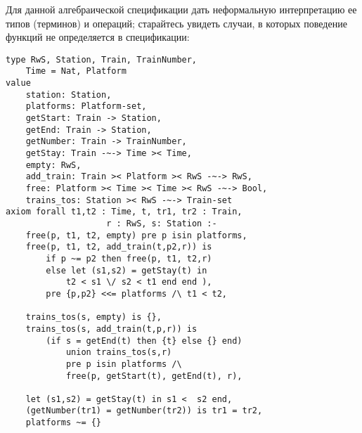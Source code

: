 \z Для данной алгебраической спецификации дать неформальную интерпретацию ее типов (терминов) и операций; старайтесь увидеть случаи, в которых поведение функций не определяется в спецификации:
\begin{lstlisting}
type RwS, Station, Train, TrainNumber,
    Time = Nat, Platform
value
    station: Station,
    platforms: Platform-set,
    getStart: Train -> Station,
    getEnd: Train -> Station,
    getNumber: Train -> TrainNumber,
    getStay: Train -~-> Time >< Time,
    empty: RwS,
    add_train: Train >< Platform >< RwS -~-> RwS,
    free: Platform >< Time >< Time >< RwS -~-> Bool,
    trains_tos: Station >< RwS -~-> Train-set
axiom forall t1,t2 : Time, t, tr1, tr2 : Train,
                    r : RwS, s: Station :-
    free(p, t1, t2, empty) pre p isin platforms,
    free(p, t1, t2, add_train(t,p2,r)) is
        if p ~= p2 then free(p, t1, t2,r)
        else let (s1,s2) = getStay(t) in
            t2 < s1 \/ s2 < t1 end end ),
        pre {p,p2} <<= platforms /\ t1 < t2,

    trains_tos(s, empty) is {},
    trains_tos(s, add_train(t,p,r)) is
        (if s = getEnd(t) then {t} else {} end)
            union trains_tos(s,r)
            pre p isin platforms /\
            free(p, getStart(t), getEnd(t), r),

    let (s1,s2) = getStay(t) in s1 <  s2 end,
    (getNumber(tr1) = getNumber(tr2)) is tr1 = tr2,
    platforms ~= {}
\end{lstlisting}


